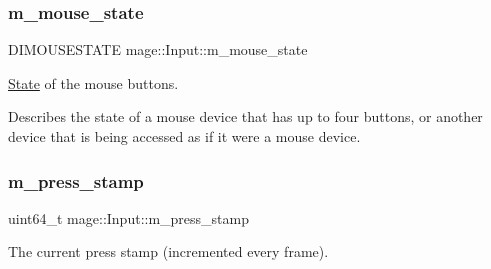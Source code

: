 \subsubsection{\texorpdfstring{m\+\_\+mouse\+\_\+state}{m\_mouse\_state}}
{\footnotesize\ttfamily D\+I\+M\+O\+U\+S\+E\+S\+T\+A\+TE mage\+::\+Input\+::m\+\_\+mouse\+\_\+state\hspace{0.3cm}{\ttfamily [private]}}

\hyperlink{classmage_1_1_state}{State} of the mouse buttons.

Describes the state of a mouse device that has up to four buttons, or another device that is being accessed as if it were a mouse device. \hypertarget{classmage_1_1_input_a30ac0d05616daa4211b59d680fae6d76}{}\label{classmage_1_1_input_a30ac0d05616daa4211b59d680fae6d76} 
\subsubsection{\texorpdfstring{m\+\_\+press\+\_\+stamp}{m\_press\_stamp}}
{\footnotesize\ttfamily uint64\+\_\+t mage\+::\+Input\+::m\+\_\+press\+\_\+stamp\hspace{0.3cm}{\ttfamily [private]}}

The current press stamp (incremented every frame). 
